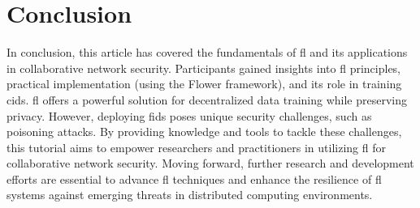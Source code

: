 \documentclass[conference]{IEEEtran}
\begin{document}
\section{Conclusion} %
\glsresetall



In conclusion, this article has covered the fundamentals of \gls{fl} and its applications in collaborative network security. Participants gained insights into \gls{fl} principles, practical implementation (using the Flower framework), and its role in training \gls{cids}. \gls{fl} offers a powerful solution for decentralized data training while preserving privacy. However, deploying \gls{fids} poses unique security challenges, such as poisoning attacks. By providing knowledge and tools to tackle these challenges, this tutorial aims to empower researchers and practitioners in utilizing \gls{fl} for collaborative network security. Moving forward, further research and development efforts are essential to advance \gls{fl} techniques and enhance the resilience of \gls{fl} systems against emerging threats in distributed computing environments.


\printbibliography
\end{document}
